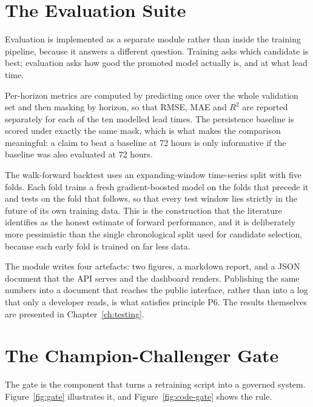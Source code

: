 \section{The Evaluation Suite}
\label{sec:impl-evaluate}
Evaluation is implemented as a separate module rather than inside the training
pipeline, because it answers a different question. Training asks which candidate
is best; evaluation asks how good the promoted model actually is, and at what
lead time.

Per-horizon metrics are computed by predicting once over the whole validation set
and then masking by horizon, so that RMSE, MAE and $R^2$ are reported separately
for each of the ten modelled lead times. The persistence baseline is scored under
exactly the same mask, which is what makes the comparison meaningful: a claim to
beat a baseline at 72 hours is only informative if the baseline was also
evaluated at 72 hours.

The walk-forward backtest uses an expanding-window time-series split with five
folds. Each fold trains a fresh gradient-boosted model on the folds that precede
it and tests on the fold that follows, so that every test window lies strictly in
the future of its own training data. This is the construction that the
literature~\cite{ref:tashman,ref:bergmeir} identifies as the honest estimate of
forward performance, and it is deliberately more pessimistic than the single
chronological split used for candidate selection, because each early fold is
trained on far less data.

The module writes four artefacts: two figures, a markdown report, and a JSON
document that the API serves and the dashboard renders. Publishing the same
numbers into a document that reaches the public interface, rather than into a log
that only a developer reads, is what satisfies principle P6. The results
themselves are presented in Chapter~\ref{ch:testing}.

\section{The Champion-Challenger Gate}
\label{sec:impl-gate}
The gate is the component that turns a retraining script into a governed system.
Figure~\ref{fig:gate} illustrates it, and Figure~\ref{fig:code-gate} shows the
rule.



